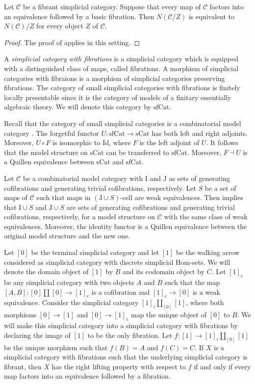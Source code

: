 \documentclass[reqno]{amsart}
\theoremstyle{definition}
\theoremstyle{remark}
\newcommand{\fs}[1]{\mathrm{#1}}
\newcommand{\Hom}{\fs{Hom}}
\newcommand{\cat}[1]{\mathcal{#1}}
\newcommand{\C}{\cat{C}}
\newcommand{\Id}{\fs{Id}}
\newcommand{\sCat}{\fs{sCat}}
\newcommand{\sfCat}{\fs{sfCat}}
\newcommand{\I}{\fs{I}}
\newcommand{\J}{\fs{J}}
\newcommand{\class}[2]{#1\text{-}\mathrm{#2}}
\newcommand{\Icell}[1][\I]{\class{#1}{cell}}
\numberwithin{figure}{section}
\begin{document}
\begin{prop}
Let $\C$ be a fibrant simplicial category.
Suppose that every map of $\C$ factors into an equivalence followed by a basic fibration.
Then $N(\C/Z)$ is equivalent to $N(\C)/Z$ for every object $Z$ of $\C$.
\end{prop}
\begin{proof}
The proof of \cite[Lemma~6.1.3.13]{lurie-topos} applies in this setting.
\end{proof}

A \emph{simplicial category with fibrations} is a simplicial category which is equipped with a distinguished class of maps, called fibrations.
A morphism of simplicial categories with fibraions is a morphism of simplicial categories preserving fibrations.
The category of small simplicial categories with fibrations is finitely locally presentable since it is the category of models of a finitary essentially algebraic theory.
We will denote this category by $\sfCat$.

Recall that the category of small simplicial categories is a combinatorial model category \cite[Proposition~A.3.2.4]{lurie-topos}.
The forgetful functor $U : \sfCat \to \sCat$ has both left and right adjoints.
Moreover, $U \circ F$ is isomorphic to $\Id$, where $F$ is the left adjoint of $U$.
It follows that the model structure on $\sCat$ can be transferred to $\sfCat$.
Moreover, $F \dashv U$ is a Quillen equivalence between $\sCat$ and $\sfCat$.

Let $\C$ be a combinatorial model category with $\I$ and $\J$ as sets of generating cofibrations and generating trivial cofibrations, respectively.
Let $S$ be a set of maps of $\C$ such that maps in $\Icell[(\J \cup S)]$ are weak equivalences.
Then \cite[Theorem~2.1.19]{hovey} implies that $\I \cup S$ and $\J \cup S$ are sets of generating cofibrations and generating trivial cofibrations, respectively, for a model structure on $\C$ with the same class of weak equivalences.
Moreover, the identity functor is a Quillen equivalence between the original model structure and the new one.

Let $[0]$ be the terminal simplicial category and let $[1]$ be the walking arrow considered as simplicial category with discrete simplicial $\Hom$-sets.
We will denote the domain object of $[1]$ by $B$ and its codomain object by $C$.
Let $[1]_e$ be any simplicial category with two objects $A$ and $B$ such that the map $[A,B] : [0] \amalg [0] \to [1]_e$ is a cofibration and $[1]_e \to [0]$ is a weak equivalence.
Consider the simplicial category $[1]_i \amalg_{[0]} [1]$, where both morphisms $[0] \to [1]$ and $[0] \to [1]_e$ map the unique object of $[0]$ to $B$.
We will make this simplicial category into a simplicial category with fibrations by declaring the image of $[1]$ to be the only fibration.
Let $f : [1] \to [1]_i \amalg_{[0]} [1]$ be the unique morphism such that $f(B) = A$ and $f(C) = C$.
If $X$ is a simplicial category with fibrations such that the underlying simplicial category is fibrant, then $X$ has the right lifting property with respect to $f$ if and only if every map factors into an equivalence followed by a fibration.



\end{document}
